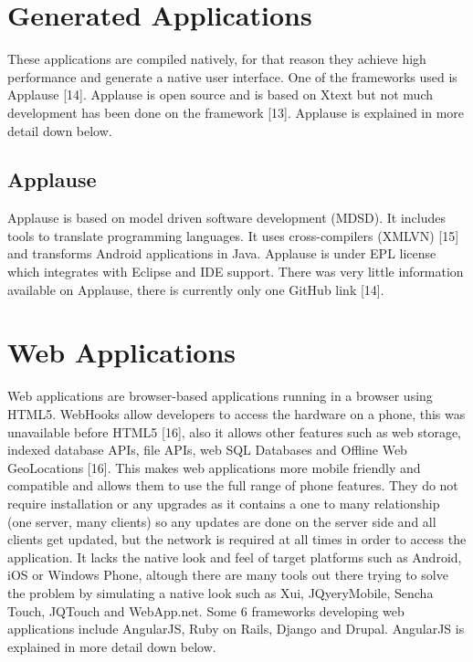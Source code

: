 \section{Generated Applications}

These applications are compiled natively, for that reason they achieve
high performance and generate a native user interface. One of the
frameworks used is Applause [14]. Applause is open source and is based on
Xtext but not much development has been done on the framework [13].
Applause is explained in more detail down below.

\subsection{Applause}

Applause is based on model driven software development (MDSD). It
includes tools to translate programming languages. It uses cross-compilers
(XMLVN) [15] and transforms Android applications in Java. Applause is
under EPL license which integrates with Eclipse and IDE support. There was
very little information available on Applause, there is currently only one
GitHub link [14].

\section{Web Applications}

Web applications are browser-based applications running in a browser
using HTML5. WebHooks allow developers to access the hardware on a
phone, this was unavailable before HTML5 [16], also it allows other features
such as web storage, indexed database APIs, file APIs, web SQL Databases and
Offline Web GeoLocations [16]. This makes web applications more mobile
friendly and compatible and allows them to use the full range of phone
features. They do not require installation or any upgrades as it contains a one
to many relationship (one server, many clients) so any updates are done on
the server side and all clients get updated, but the network is required at all
times in order to access the application. It lacks the native look and feel of
target platforms such as Android, iOS or Windows Phone, altough there are
many tools out there trying to solve the problem by simulating a native look
such as Xui, JQyeryMobile, Sencha Touch, JQTouch and WebApp.net. Some
6
frameworks developing web applications include AngularJS, Ruby on Rails,
Django and Drupal. AngularJS is explained in more detail down below.

